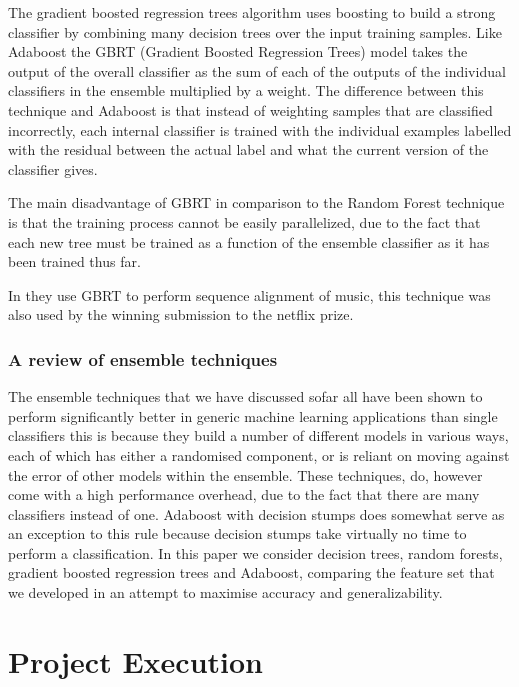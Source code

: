 \documentclass[ %
                    author={Sam Phippen},
                supervisor={Dr. Rafal Bogacz},
                     title={Real time voice activity detectors in noisy personal computing environments},
                  subtitle={},
                    degree={MEng},
                      year={2012} ]{thesis}
\begin{document}
The gradient boosted regression trees algorithm uses boosting to build a strong
classifier by combining many decision trees over the input training samples.
Like Adaboost the GBRT (Gradient Boosted Regression Trees) model takes the
output of the overall classifier as the sum of each of the outputs of the
individual classifiers in the ensemble multiplied by a weight. The difference
between this technique and Adaboost is that instead of weighting samples that
are classified incorrectly, each internal classifier is trained with the
individual examples labelled with the residual between the actual label and
what the current version of the classifier gives.

The main disadvantage of GBRT in comparison to the Random Forest technique is
that the training process cannot be easily parallelized, due to the fact that
each new tree must be trained as a function of the ensemble classifier as it
has been trained thus far.

In \cite{parker} they use GBRT to perform sequence alignment of music, this
technique was also used by the winning submission to the netflix prize.

\subsection{A review of ensemble techniques}

The ensemble techniques that we have discussed sofar all have been shown to
perform significantly better in generic machine learning applications than
single classifiers this is because they build a number of different models in
various ways, each of which has either a randomised component, or is reliant on
moving against the error of other models within the ensemble. These techniques,
do, however come with a high performance overhead, due to the fact that there
are many classifiers instead of one. Adaboost with decision stumps does
somewhat serve as an exception to this rule because decision stumps take
virtually no time to perform a classification. In this paper we consider
decision trees, random forests, gradient boosted regression trees and Adaboost,
comparing the feature set that we developed in an attempt to maximise accuracy
and generalizability.


\chapter{Project Execution}
\label{chap:execution}
\end{document}
